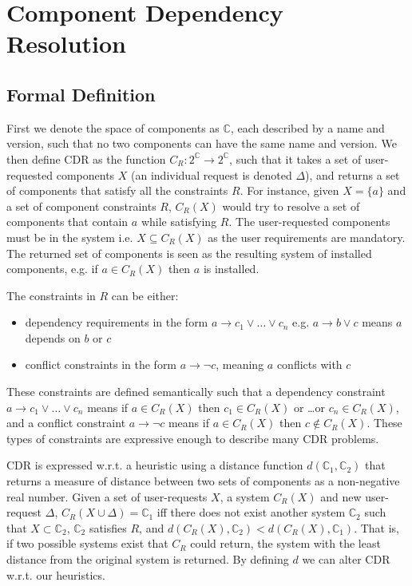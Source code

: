 \chapter{Component Dependency Resolution}
\label{cdr}

\section{Formal Definition}
First we denote the space of components as $\mathbb{C}$, each described by a name and version, such that no two components can have the same name and version.
We then define CDR as the function $C_R: 2^\mathbb{C} \rightarrow 2^\mathbb{C}$, 
such that it takes a set of user-requested components $X$ (an individual request is denoted $\Delta$),
and returns a set of components that satisfy all the constraints $R$.
For instance, given $X = \{a\}$ and a set of component constraints $R$,
$C_R(X)$ would try to resolve a set of components that contain $a$ while satisfying $R$.
The user-requested components must be in the system i.e. $X \subseteq C_R(X)$ as the user requirements are mandatory.
The returned set of components is seen as the resulting system of installed components, e.g. if $a \in C_R(X)$ then $a$ is installed.

The constraints in $R$ can be either: 
\begin{itemize}
  \item dependency requirements in the form $a \rightarrow c_1 \vee \ldots \vee c_n$ e.g. $a \rightarrow b \vee c$ means $a$ depends on $b$ or $c$
  \item conflict constraints in the form $a \rightarrow \neg c$, meaning $a$ conflicts with $c$
\end{itemize}
These constraints are defined semantically such that
a dependency constraint $a \rightarrow c_1 \vee \ldots \vee c_n$ means if $a \in C_R(X)$ then $c_1 \in C_R(X)$ or \ldots or $c_n \in C_R(X)$,
and a conflict constraint $a \rightarrow \neg c$ means if $a \in C_R(X)$ then $c \not \in C_R(X)$.
These types of constraints are expressive enough to describe many CDR problems.

CDR is expressed w.r.t. a heuristic using a distance function $d(\mathbb{C}_1,\mathbb{C}_2)$ 
that returns a measure of distance between two sets of components as a non-negative real number.
Given a set of user-requests $X$, a system $C_R(X)$ and new user-request $\Delta$,
$C_R(X \cup \Delta) = \mathbb{C}_1$ iff there does not exist another system $\mathbb{C}_2$ such that $X \subset \mathbb{C}_2$, $\mathbb{C}_2$ satisfies $R$, 
and $d(C_R(X),\mathbb{C}_2) < d(C_R(X),\mathbb{C}_1)$.
That is, if two possible systems exist that $C_R$ could return, the system with the least distance from the original system is returned. 
By defining $d$ we can alter CDR w.r.t. our heuristics.

